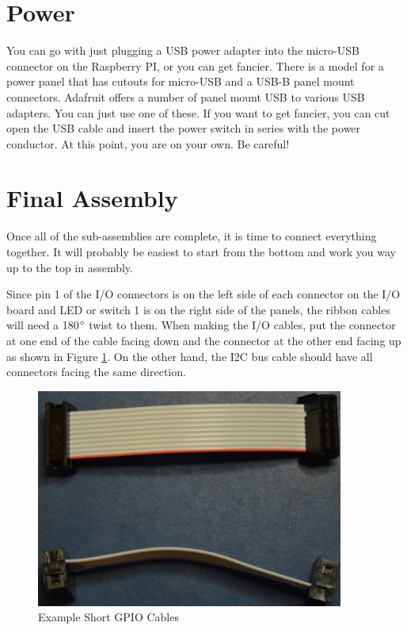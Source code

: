 \documentclass[10pt, openany]{book}
\begin{document}
\section{Power}
You can go with just plugging a USB power adapter into the micro-USB connector on the Raspberry PI, or you can get fancier.  There is a model for a power panel that has cutouts for micro-USB and a USB-B panel mount connectors.  Adafruit offers a number of panel mount USB to various USB adapters.  You can just use one of these.  If you want to get fancier, you can cut open the USB cable and insert the power switch in series with the power conductor.  At this point, you are on your own.  Be careful!

\section{Final Assembly}
Once all of the sub-assemblies are complete, it is time to connect everything together.  It will probably be easiest to start from the bottom and work you way up to the top in assembly.

Since pin 1 of the I/O connectors is on the left side of each connector on the I/O board and LED or switch 1 is on the right side of the panels, the ribbon cables will need a 180$\degree$ twist to them.  When making the I/O cables, put the connector at one end of the cable facing down and the connector at the other end facing up as shown in Figure \ref{fig:GPIOCable}.  On the other hand, the I2C bus cable should have all connectors facing the same direction.

\begin{figure}[ht!]
  \centering
  \includegraphics[width=0.9\textwidth]{../Pict/GPIO-Cable.jpg}
  \caption{Example Short GPIO Cables}
  \label{fig:GPIOCable}
\end{figure}
\end{document}
